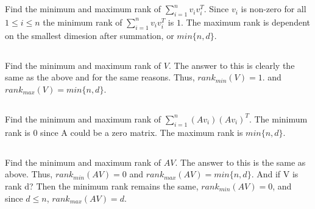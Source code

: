 \section{}

\subsection{}

Find the minimum and maximum rank of $\sum_{i=1}^n v_i v_i^T$. Since $v_i$ is non-zero for all $1 \leq i \leq n$ the minimum rank of $\sum_{i=1}^n v_i v_i^T$ is $1$. The maximum rank is dependent on the smallest dimesion after summation, or $min\{n, d\}$.

\subsection{}

Find the minimum and maximum rank of $V$. The answer to this is clearly the same as the above and for the same reasons. Thus, $rank_{min}(V) = 1$. and $rank_{max}(V) = min\{n, d\}$.

\subsection{}

Find the minimum and maximum rank of $\sum_{i=1}^n (Av_i)(Av_i)^T$. The minimum rank is 0 since A could be a zero matrix. The maximum rank is $min\{n, d\}$. 

\subsection{}

Find the minimum and maximum rank of $AV$. The answer to this is the same as above. Thus, $rank_{min}(AV) = 0$ and $rank_{max}(AV) = min\{n, d\}$. And if V is rank d? Then the minimum rank remains the same, $rank_{min}(AV) = 0$, and since $d \leq n$, $rank_{max}(AV) = d$.
